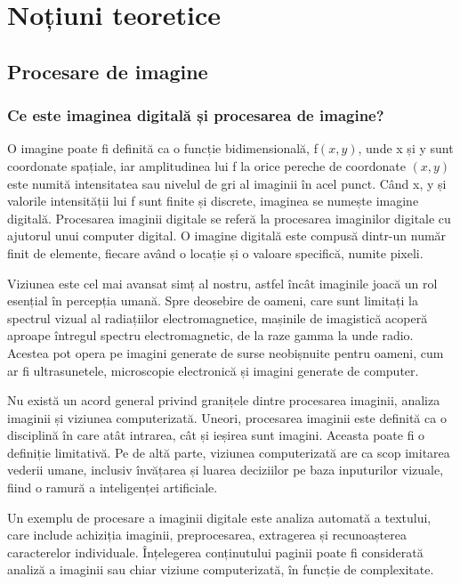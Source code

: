\chapter{Noțiuni teoretice}

\section{Procesare de imagine}

\subsection*{Ce este imaginea digitală și procesarea de imagine?}

O imagine poate fi definită ca o funcție bidimensională, f$(x,y)$, unde x și y sunt coordonate spațiale, iar amplitudinea lui f la orice pereche de coordonate $(x, y)$ este numită intensitatea sau nivelul de gri al imaginii în acel punct. Când x, y și valorile intensității lui f sunt finite și discrete, imaginea se numește imagine digitală. Procesarea imaginii digitale se referă la procesarea imaginilor digitale cu ajutorul unui computer digital. O imagine digitală este compusă dintr-un număr finit de elemente, fiecare având o locație și o valoare specifică, numite pixeli.

Viziunea este cel mai avansat simț al nostru, astfel încât imaginile joacă un rol esențial în percepția umană. Spre deosebire de oameni, care sunt limitați la spectrul vizual al radiațiilor electromagnetice, mașinile de imagistică acoperă aproape întregul spectru electromagnetic, de la raze gamma la unde radio. Acestea pot opera pe imagini generate de surse neobișnuite pentru oameni, cum ar fi ultrasunetele, microscopie electronică și imagini generate de computer.

Nu există un acord general privind granițele dintre procesarea imaginii, analiza imaginii și viziunea computerizată. Uneori, procesarea imaginii este definită ca o disciplină în care atât intrarea, cât și ieșirea sunt imagini. Aceasta poate fi o definiție limitativă. Pe de altă parte, viziunea computerizată are ca scop imitarea vederii umane, inclusiv învățarea și luarea deciziilor pe baza inputurilor vizuale, fiind o ramură a inteligenței artificiale.

Un exemplu de procesare a imaginii digitale este analiza automată a textului, care include achiziția imaginii, preprocesarea, extragerea și recunoașterea caracterelor individuale. Înțelegerea conținutului paginii poate fi considerată analiză a imaginii sau chiar viziune computerizată, în funcție de complexitate.

